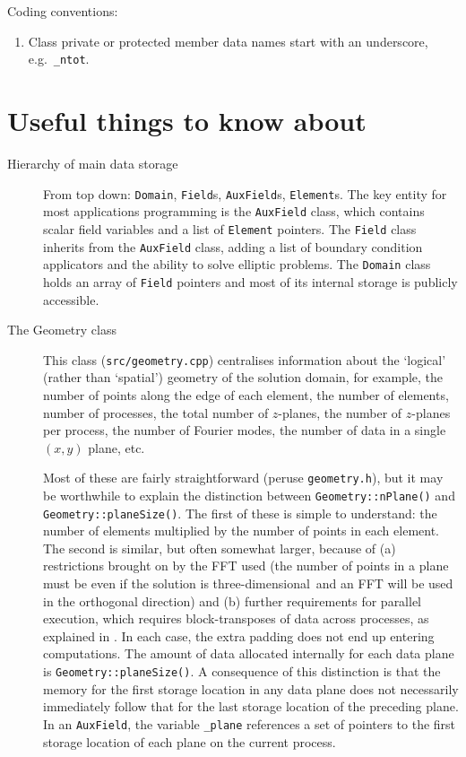 \documentclass[11pt]{report}
\newcommand\threed{three-di\-men\-sion\-al}
\newcommand{\eg}{e.g.\ } \newcommand{\CC}{\mathrm{c.c.}}
\begin{document}
Coding conventions:
\begin{enumerate}
\item
Class private or protected member data names start with an underscore,
\eg \texttt{\_ntot}.
\end{enumerate}

\section{Useful things to know about}

\begin{description}

\item[Hierarchy of main data storage] From top down: \verb|Domain|,
  \verb|Field|s, \verb|AuxField|s, \verb|Element|s. The key entity for
  most applications programming is the \verb|AuxField| class, which
  contains scalar field variables and a list of \verb|Element|
  pointers.  The \verb|Field| class inherits from the \verb|AuxField|
  class, adding a list of boundary condition applicators and the
  ability to solve elliptic problems.  The \verb|Domain| class holds
  an array of \verb|Field| pointers and most of its internal storage
  is publicly accessible.
  
\item[The Geometry class] This class (\verb|src/geometry.cpp|)
  centralises information about the `logical' (rather than `spatial')
  geometry of the solution domain, for example, the number of points
  along the edge of each element, the number of elements, number of
  processes, the total number of $z$-planes, the number of $z$-planes
  per process, the number of Fourier modes, the number of data in a
  single $(x,y)$ plane, etc.

  Most of these are fairly straightforward (peruse \verb|geometry.h|),
  but it may be worthwhile to explain the distinction between
  \verb|Geometry::nPlane()| and \verb|Geometry::planeSize()|.  The
  first of these is simple to understand: the number of elements
  multiplied by the number of points in each element.  The second is
  similar, but often somewhat larger, because of (a) restrictions
  brought on by the FFT used (the number of points in a plane must be
  even if the solution is \threed\ and an FFT will be used in the
  orthogonal direction) and (b) further requirements for parallel
  execution, which requires block-transposes of data across
  processes, as explained in \citet{rb06}.  In each case, the extra
  padding does not end up entering computations.  The amount of data
  allocated internally for each data plane is
  \verb|Geometry::planeSize()|.  A consequence of this distinction is
  that the memory for the first storage location in any data plane
  does not necessarily immediately follow that for the last storage
  location of the preceding plane.  In an \verb|AuxField|, the
  variable \verb|_plane| references a set of pointers to the first
  storage location of each plane on the current process.


\end{description}
\end{document}
